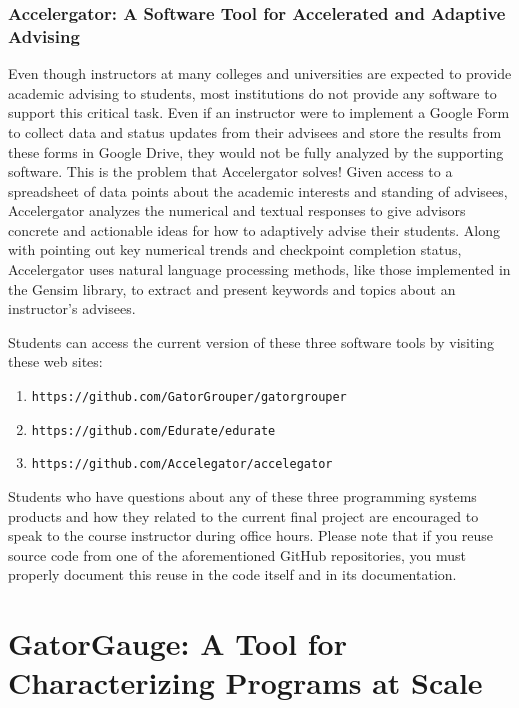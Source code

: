 \documentclass[11pt]{article}
\newcommand{\url}[1]{\lstinline{#1}}
\begin{document}
\subsubsection*{Accelergator: A Software Tool for Accelerated and Adaptive Advising}

Even though instructors at many colleges and universities are expected to provide academic advising to students, most
institutions do not provide any software to support this critical task. Even if an instructor were to implement a Google
Form to collect data and status updates from their advisees and store the results from these forms in Google Drive, they
would not be fully analyzed by the supporting software. This is the problem that Accelergator solves! Given access to a
spreadsheet of data points about the academic interests and standing of advisees, Accelergator analyzes the numerical
and textual responses to give advisors concrete and actionable ideas for how to adaptively advise their students. Along
with pointing out key numerical trends and checkpoint completion status, Accelergator uses natural language processing
methods, like those implemented in the Gensim library, to extract and present keywords and topics about an instructor's
advisees.

\noindent
Students can access the current version of these three software tools by visiting these web sites:

\begin{enumerate}
  \item \url{https://github.com/GatorGrouper/gatorgrouper}
  \item \url{https://github.com/Edurate/edurate}
  \item \url{https://github.com/Accelegator/accelegator}
\end{enumerate}

\noindent Students who have questions about any of these three programming systems products and how they related to the
current final project are encouraged to speak to the course instructor during office hours. Please note that if you
reuse source code from one of the aforementioned GitHub repositories, you must properly document this reuse in the code
itself and in its documentation.

\section*{GatorGauge: A Tool for Characterizing Programs at Scale}
\end{document}
